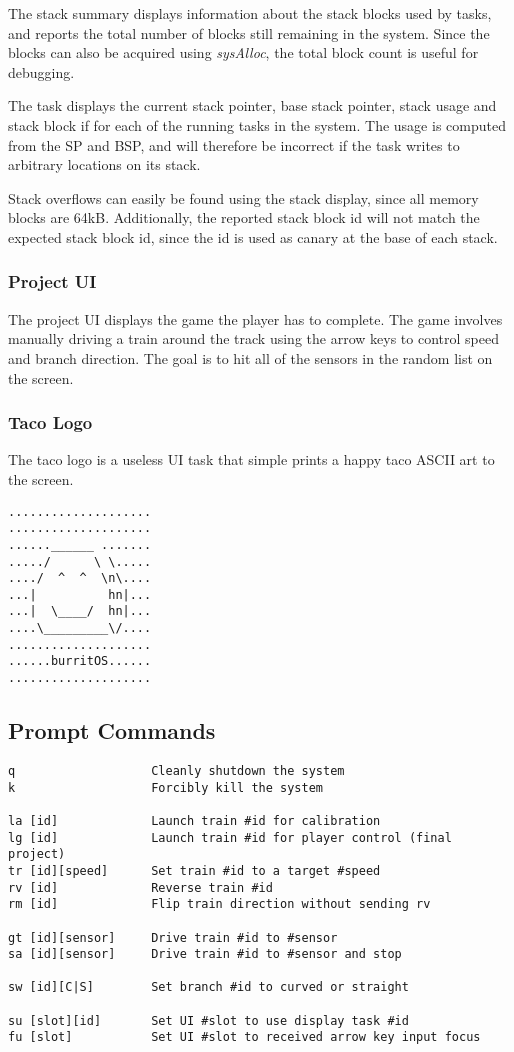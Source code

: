 \documentclass[twoside,a4paper]{refart}
\begin{document}
The stack summary displays information about the stack blocks used by tasks, and reports the total number of blocks still remaining in the system. Since the blocks can also be acquired using \textit{sysAlloc}, the total block count is useful for debugging.

The task displays the current stack pointer, base stack pointer, stack usage and stack block if for each of the running tasks in the system. The usage is computed from the SP and BSP, and will therefore be incorrect if the task writes to arbitrary locations on its stack.

Stack overflows can easily be found using the stack display, since all memory blocks are 64kB. Additionally, the reported stack block id will not match the expected stack block id, since the id is used as canary at the base of each stack.

\subsubsection{Project UI}

The project UI displays the game the player has to complete. The game involves manually driving a train around the track using the arrow keys to control speed and branch direction. The goal is to hit all of the sensors in the random list on the screen.

\subsubsection{Taco Logo}

The taco logo is a useless UI task that simple prints a happy taco ASCII art to the screen.

\begin{verbatim}
....................
....................
......______ .......
...../      \ \.....
..../  ^  ^  \n\....
...|          hn|...
...|  \____/  hn|...
....\_________\/....
....................
......burritOS......
....................
\end{verbatim}

\subsection{Prompt Commands}
\begin{verbatim}
q                   Cleanly shutdown the system
k                   Forcibly kill the system

la [id]             Launch train #id for calibration
lg [id]             Launch train #id for player control (final project)
tr [id][speed]      Set train #id to a target #speed
rv [id]             Reverse train #id
rm [id]             Flip train direction without sending rv

gt [id][sensor]     Drive train #id to #sensor
sa [id][sensor]     Drive train #id to #sensor and stop

sw [id][C|S]        Set branch #id to curved or straight

su [slot][id]       Set UI #slot to use display task #id
fu [slot]           Set UI #slot to received arrow key input focus
\end{verbatim}
\end{document}
